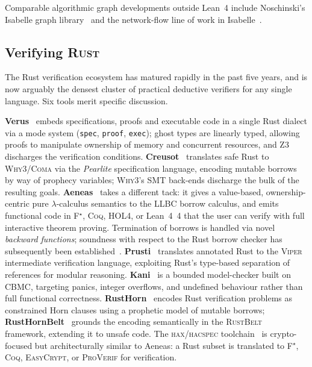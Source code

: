 \documentclass[11pt,a4paper]{article}
\newcommand{\Lean}{Lean~4\xspace}
\newcommand{\code}[1]{\texttt{#1}}
\theoremstyle{plain}
\theoremstyle{definition}
\begin{document}
Comparable algorithmic graph developments outside \Lean{} include
Noschinski's Isabelle graph library~\cite{Noschinski2015GraphLib} and the
network-flow line of work in
Isabelle~\cite{LammichSefidgar2016EK,Lammich2019JAR}.

\subsection{Verifying \textsc{Rust}}\label{sec:rel-rust}

The Rust verification ecosystem has matured rapidly in the past five years,
and is now arguably the densest cluster of practical deductive verifiers
for any single language. Six tools merit specific discussion.

\textbf{Verus}~\cite{Lattuada2023Verus,Lattuada2024Verus} embeds
specifications, proofs and executable code in a single Rust dialect via a
mode system (\code{spec}, \code{proof}, \code{exec}); ghost types are
linearly typed, allowing proofs to manipulate ownership of memory and
concurrent resources, and Z3 discharges the verification conditions.
\textbf{Creusot}~\cite{DenisJourdanMarche2022Creusot} translates safe Rust
to \textsc{Why3}/\textsc{Coma} via the \emph{Pearlite} specification
language, encoding mutable borrows by way of prophecy variables;
\textsc{Why3}'s SMT back-ends discharge the bulk of the resulting goals.
\textbf{Aeneas}~\cite{HoProtzenko2022Aeneas,HoFromherzProtzenko2024Aeneas}
takes a different tack: it gives a value-based, ownership-centric pure
$\lambda$-calculus semantics to the LLBC borrow calculus, and emits
functional code in F$^\star$, \textsc{Coq}, \textsc{HOL4}, or \Lean{}~4
that the user can verify with full interactive theorem proving. Termination
of borrows is handled via novel \emph{backward functions}; soundness with
respect to the Rust borrow checker has subsequently been
established~\cite{HoFromherzProtzenko2024Aeneas}.
\textbf{Prusti}~\cite{Astrauskas2019Prusti,Astrauskas2022Prusti} translates
annotated Rust to the \textsc{Viper} intermediate verification language,
exploiting Rust's type-based separation of references for modular reasoning.
\textbf{Kani}~\cite{VanHattum2022Kani} is a bounded model-checker built on
\textsc{CBMC}, targeting panics, integer overflows, and undefined behaviour
rather than full functional correctness.
\textbf{RustHorn}~\cite{Matsushita2020RustHorn} encodes Rust verification
problems as constrained Horn clauses using a prophetic model of mutable
borrows; \textbf{RustHornBelt}~\cite{Matsushita2022RustHornBelt} grounds the
encoding semantically in the \textsc{RustBelt}~\cite{JungRustBelt2018}
framework, extending it to unsafe code.
The \textsc{hax}/\textsc{hacspec} toolchain~\cite{HacspecHax2024} is
crypto-focused but architecturally similar to Aeneas: a Rust subset is
translated to F$^\star$, \textsc{Coq}, \textsc{EasyCrypt}, or
\textsc{ProVerif} for verification.
\end{document}
